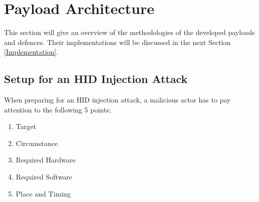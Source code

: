 \section{Payload Architecture}


This section will give an overview of the methodologies of the developed payloads and defences. Their implementations will be discussed in the next Section \ref{Implementation}. \\

\subsection{Setup for an HID Injection Attack}

When preparing for an HID injection attack, a malicious actor has to pay attention to the following 5 points;
\begin{enumerate}
    \item Target
    \item Circumstance 
    \item Required Hardware
    \item Required Software
    \item Place and Timing
\end{enumerate}

